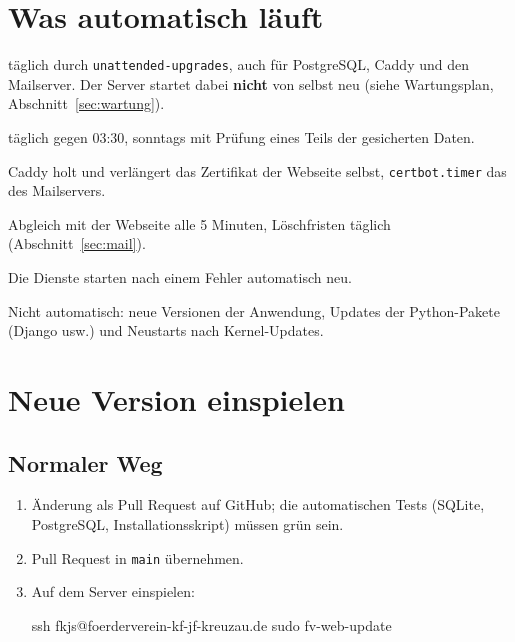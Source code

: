 \documentclass[a4paper,fontsize=10pt]{scrartcl}
\newcommand*{\cmd}[1]{\texttt{#1}}
\begin{document}
\section{Was automatisch läuft}

\begin{description}[style=nextline,leftmargin=0pt,itemsep=0.3\baselineskip]
  \item[Sicherheitsupdates von Debian] täglich durch \cmd{unattended-upgrades}, auch für
    PostgreSQL, Caddy und den Mailserver. Der Server startet dabei \textbf{nicht} von
    selbst neu (siehe Wartungsplan, Abschnitt~\ref{sec:wartung}).
  \item[Datensicherung] täglich gegen 03:30, sonntags mit Prüfung eines Teils der
    gesicherten Daten.
  \item[Zertifikate] Caddy holt und verlängert das Zertifikat der Webseite selbst,
    \cmd{certbot.timer} das des Mailservers.
  \item[Mailserver] Abgleich mit der Webseite alle 5 Minuten, Löschfristen täglich
    (Abschnitt~\ref{sec:mail}).
  \item[Neustart bei Absturz] Die Dienste starten nach einem Fehler automatisch neu.
\end{description}

Nicht automatisch: neue Versionen der Anwendung, Updates der Python-Pakete
(Django usw.) und Neustarts nach Kernel-Updates.

\section{Neue Version einspielen}\label{sec:update}

\subsection{Normaler Weg}

\begin{enumerate}
  \item Änderung als Pull Request auf GitHub; die automatischen Tests (SQLite,
        PostgreSQL, Installationsskript) müssen grün sein.
  \item Pull Request in \cmd{main} übernehmen.
  \item Auf dem Server einspielen:
\begin{befehl}
ssh fkjs@foerderverein-kf-jf-kreuzau.de sudo fv-web-update
\end{befehl}
\end{enumerate}
\end{document}
